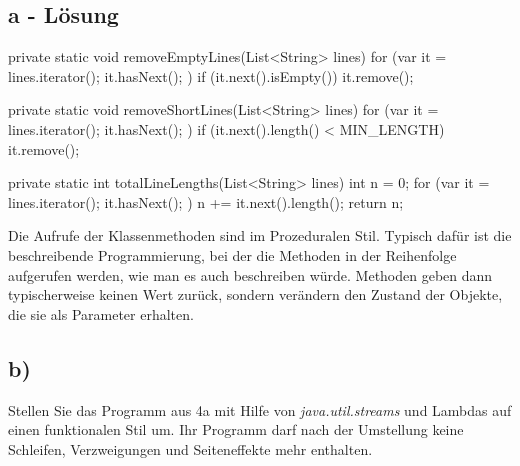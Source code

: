 \subsection*{a - Lösung}
\newline
\begin{code}[language=java, caption={Aufgabe 4a - Lösung}, label={lst:Aufgabe4a}]
    private static void removeEmptyLines(List<String> lines) {
        for (var it = lines.iterator(); it.hasNext(); ) {
            if (it.next().isEmpty()) {
                it.remove();
            }
        }
    }

    private static void removeShortLines(List<String> lines) {
        for (var it = lines.iterator(); it.hasNext(); ) {
            if (it.next().length() < MIN_LENGTH) {
                it.remove();
            }
        }
    }

    private static int totalLineLengths(List<String> lines) {
        int n = 0;
        for (var it = lines.iterator(); it.hasNext(); ) {
            n += it.next().length();
        }
        return n;
    }
\end{code}
\newline
Die Aufrufe der Klassenmethoden sind im Prozeduralen Stil.
Typisch dafür ist die beschreibende Programmierung, bei der die Methoden in der Reihenfolge aufgerufen werden, wie man es auch beschreiben würde.
Methoden geben dann typischerweise keinen Wert zurück, sondern verändern den Zustand der Objekte, die sie als Parameter erhalten.
\newline

\subsection*{b)}
Stellen Sie das Programm aus 4a mit Hilfe von \textit{java.util.streams} und Lambdas auf einen funktionalen Stil um.
Ihr Programm darf nach der Umstellung keine Schleifen, Verzweigungen und Seiteneffekte mehr enthalten.
\newline
\newline
